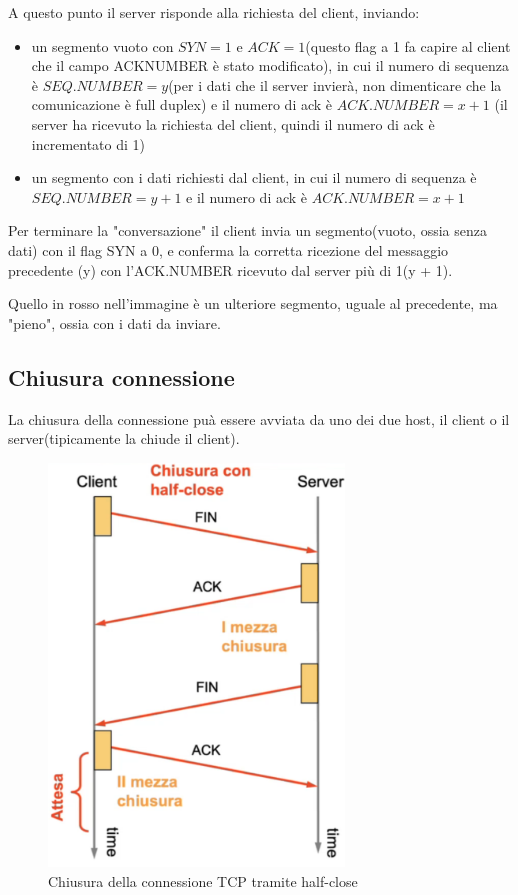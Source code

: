 A questo punto il server risponde alla richiesta del client, inviando:
\begin{itemize}
    \item un segmento vuoto con $SYN = 1$ e $ACK = 1$(questo flag a 1 fa capire al client che il campo ACKNUMBER è stato modificato), in cui il numero di sequenza è $SEQ.NUMBER = y$(per i dati che il server invierà, non dimenticare che la comunicazione è full duplex) e il numero di ack è $ACK.NUMBER = x + 1$ (il server ha ricevuto la richiesta del client, quindi il numero di ack è incrementato di 1)
    \item un segmento con i dati richiesti dal client, in cui il numero di sequenza è $SEQ.NUMBER = y + 1$ e il numero di ack è $ACK.NUMBER = x + 1$
\end{itemize}

 

Per terminare la "conversazione" il client invia un segmento(vuoto, ossia senza dati) con il flag SYN a 0, e conferma la corretta ricezione del messaggio precedente (y) con l'ACK.NUMBER ricevuto dal server più di 1(y + 1).

Quello in rosso nell'immagine è un ulteriore segmento, uguale al precedente, ma "pieno", ossia con i dati da inviare.

\subsection{Chiusura connessione}
La chiusura della connessione puà essere avviata da uno dei due host, il client o il server(tipicamente la chiude il client).

\begin{figure}[h!]
    \centering
    \includegraphics[width=0.7\textwidth]{images/halfclosetcp.png}
    \caption{Chiusura della connessione TCP tramite half-close}
    \label{fig:halfclosetcp}
\end{figure}

